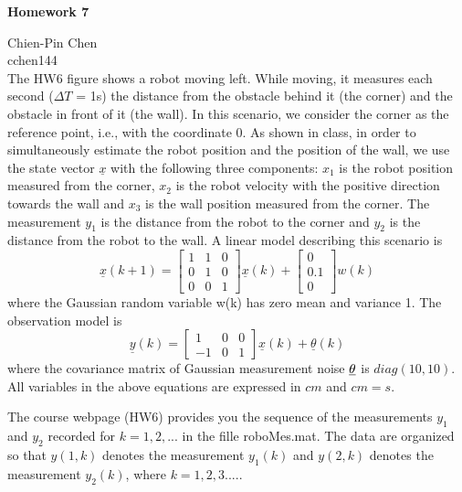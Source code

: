 \documentclass{article}
\begin{document}
 
\begin{center}
{\bf \Large  Homework 7} \\
\end{center}
Chien-Pin Chen\\
cchen144\\

The HW6 figure shows a robot moving left. While moving, it measures each second ($\Delta T$ = 1s) the distance from the obstacle behind it (the corner) and the obstacle
in front of it (the wall). In this scenario, we consider the corner as the reference
point, i.e., with the coordinate 0. As shown in class, in order to simultaneously
estimate the robot position and the position of the wall, we use the state vector
$\underline{x}$ with the following three components: $x_1$ is the robot position measured from
the corner, $x_2$ is the robot velocity with the positive direction towards the wall
and $x_3$ is the wall position measured from the corner. The measurement $y_1$ is
the distance from the robot to the corner and $y_2$ is the distance from the robot
to the wall. A linear model describing this scenario is
\begin{equation}
  \underline{x}(k+1)=\left[ 
  \begin{array}{ccc}
     1 & 1 & 0  \\
     0 & 1 & 0  \\
     0 & 0 & 1 
  \end{array}
   \right] \underline{x}(k)+ \left[
     \begin{array}{c}
     0   \\
     0.1   \\
     0
  \end{array}
   \right] w(k)
\end{equation}
where the Gaussian random variable w(k) has zero mean and variance 1. The
observation model is
\begin{equation}
 \underline{y}(k) =\left[
     \begin{array}{ccc}
     1 & 0 &  0  \\
     -1 & 0 & 1   
  \end{array}
   \right] \underline{x}(k)+\underline{\theta}(k)
\end{equation}
where the covariance matrix of Gaussian measurement noise $\underbar{$\theta$}$ 
is $diag(10, 10)$. All variables in the above equations are expressed in $cm$ and $cm=s$.

The course webpage (HW6) provides you the sequence of the measurements
$y_1$ and $y_2$ recorded for $k = 1, 2,...$ in the fille roboMes.mat. The data are
organized so that $y(1, k)$ denotes the measurement $y_1(k)$ and $y(2, k)$ 
denotes the measurement $y_2(k)$, where $k=1,2,3....$. 
\end{document}
